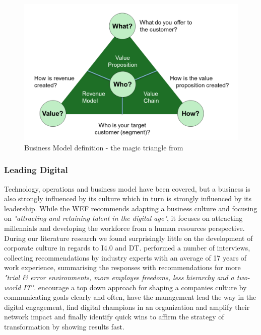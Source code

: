 \begin{figure}[H]
\centering
\includegraphics[width=1\columnwidth]{images/BMN}
\caption{Business Model definition - the magic triangle from \citeauthor{gassmann:gallen:2013geschaeftsmodelle} \cite{gassmann:gallen:2013geschaeftsmodelle}}
\label{fig:BMN}
\end{figure}


\subsubsection{Leading Digital}

Technology, operations and business model have been covered, but a business is also strongly influenced by its culture which in turn is strongly influenced by its leadership. While the \ac{WEF} recommends adapting a business culture and focusing on \emph{"attracting and retaining talent in the digital age"}\cite{worldforumdigitalenterprise:2016}, it focuses on attracting millennials and developing the workforce from a human resources perspective. During our literature research we found surprisingly little on the development of corporate culture in regards to \ac{I4.0} and \ac{DT}. \citeauthor{hammer:2015} performed a number of interviews, collecting recommendations by industry experts with an average of 17 years of work experience, summarising the responses with recommendations for more \emph{"trial \& error environments, more employee freedoms, less hierarchy and a two-world IT"}. \citeauthor{bonnect2014leading} encourage a top down approach for shaping a companies culture by communicating goals clearly and often, have the management lead the way in the digital engagement, find digital champions in an organization and amplify their network impact and finally identify quick wins to affirm the strategy of transformation by showing results fast. 


